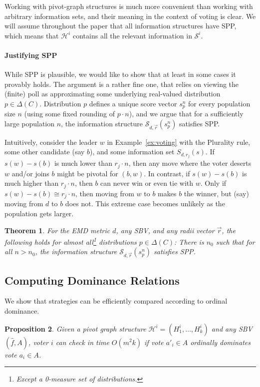 \documentclass[letterpaper]{article} %
\def\calS{\mathcal{S}}
\def\calH{\mathcal{H}}
\newtheorem{theorem}{Theorem}
\newtheorem{proposition}[theorem]{Proposition}
\begin{document}
 Working with pivot-graph structures is much more convenient than working with arbitrary information sets, and their meaning in the context of voting is clear. We will assume throughout the paper that all information structures have SPP, which means that $\calH^i$ contains all the relevant information in $\calS^i$.

\paragraph{Justifying SPP}
While SPP is plausible, we would like to show that at least in some cases it provably holds. The argument is a rather fine one, that relies on viewing the (finite) poll as approximating some underlying real-valued distribution $p\in \Delta(C)$. Distribution $p$ defines a unique score vector $s_p^n$ for every population size $n$ (using some fixed rounding of $p\cdot n$), and we argue that for a sufficiently large population $n$, the information structure $\calS_{d,\vec r}(s_p^n)$ satisfies SPP. 

Intuitively, consider the leader $w$ in Example~\ref{ex:voting} with the Plurality rule, some other candidate (say $b$), and some information set $S_{d, r_j}(s)$. If $s(w)-s(b)$ is much lower than $r_j\cdot n$, then any move where the voter deserts $w$ and/or joins $b$ might be pivotal for $(b,w)$. In contrast, if $s(w)-s(b)$ is much higher than $r_j \cdot n$, then $b$ can never win or even tie with $w$. Only if $s(w)-s(b) \cong r_j \cdot n$, then moving from $w$ to $b$ makes $b$ the winner, but (say) moving from $d$ to $b$ does not. This extreme case becomes unlikely as the population gets larger. 

\begin{theorem}
For the EMD metric $d$, any SBV, and any radii vector $\vec r$, the following holds for almost all\footnote{Except a 0-measure set of distributions.} distributions $p\in \Delta(C)$: There is $n_0$ such that for all $n>n_0$, the information structure $\calS_{d,\vec r}(s^n_p)$ satisfies SPP.
\end{theorem}

\subsection{Computing Dominance Relations}
We show that strategies can be efficiently compared according to ordinal dominance.
\begin{proposition}
Given a pivot graph structure $\calH^i=(H^i_1,\ldots,H^i_k)$ and any SBV $(\hat f,A)$, voter $i$ can check in time $O(m^2k)$ if vote $a'_i\in A$ ordinally dominates vote $a_i\in A$.
\end{proposition} 
\end{document}
